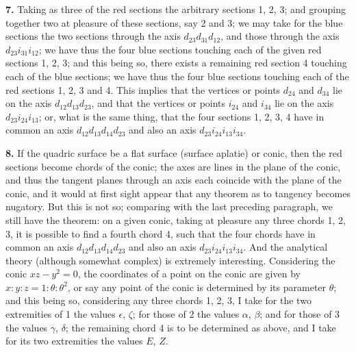 \documentclass[11pt,a4paper]{book}
\begin{document}
{{{\textbf{7.} Taking as three of the red sections the arbitrary sections 1, 2, 3; and grouping together two at pleasure of these sections, say 2 and 3; we may take for the blue sections the two sections through the axis $d_{23}d_{31}d_{12}$, and those through the axis $d_{23}i_{31}i_{12}$; we have thus the four blue sections touching each of the given red sections 1, 2, 3; and this being so, there exists a remaining red section 4 touching each of the blue sections; we have thus the four blue sections touching each of the red sections 1, 2, 3 and 4. This implies that the vertices or points $d_{24}$ and $d_{34}$ lie on the axis $d_{12}d_{13}d_{23}$, and that the vertices or points $i_{24}$ and $i_{34}$ lie on the axis $d_{23}i_{24}i_{13}$; or, what is the same thing, that the four sections 1, 2, 3, 4 have in common an axis $d_{12}d_{13}d_{14}d_{23}$ and also an axis $d_{23}i_{24}i_{13}i_{34}$.

\textbf{8.} If the quadric surface be a flat surface (surface aplatie) or conic, then the red sections become chords of the conic; the axes are lines in the plane of the conic, and thus the tangent planes through an axis each coincide with the plane of the conic, and it would at first sight appear that any theorem as to tangency becomes nugatory. But this is not so; comparing with the last preceding paragraph, we still have the theorem: on a given conic, taking at pleasure any three chords 1, 2, 3, it is possible to find a fourth chord 4, such that the four chords have in common an axis $d_{12}d_{13}d_{14}d_{23}$ and also an axis $d_{23}i_{24}i_{13}i_{34}$. And the analytical theory (although somewhat complex) is extremely interesting. Considering the conic $xz-y^{2}=0$, the coordinates of a point on the conic are given by $x:y:z = 1:\theta:\theta^{2}$, or say any point of the conic is determined by its parameter $\theta$; and this being so, considering any three chords 1, 2, 3, I take for the two extremities of 1 the values $\epsilon$, $\zeta$; for those of 2 the values $\alpha$, $\beta$; and for those of 3 the values $\gamma$, $\delta$; the remaining chord 4 is to be determined as above, and I take for its two extremities the values $E$, $Z$.

}}}
\end{document}
